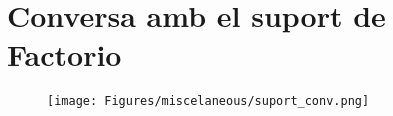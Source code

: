 

\chapter{Conversa amb el suport de Factorio} %

\label{AppendixA} %
\begin{figure}[H]
    \centering
    \texttt{[image: Figures/miscelaneous/suport\_conv.png]}
\end{figure}       
